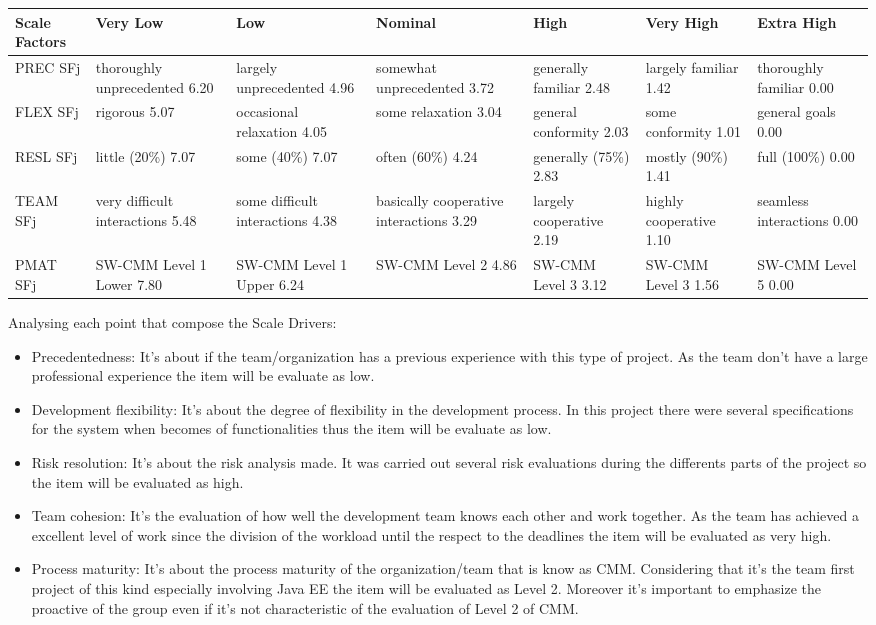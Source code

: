 \documentclass[a4paper]{article}
\begin{document}
\begin{tabular}{ | L{1.25cm} | L{2cm} | L{2cm} | L{2cm} | L{2cm} | L{2cm} | L{2cm} |}

\hline
	\textbf {Scale Factors} & \textbf {Very Low} & \textbf {Low} & \textbf {Nominal} & \textbf {High} & \textbf {Very High} & \textbf {Extra High} \\ \hline
	PREC  SFj  & thoroughly unprecedented 6.20 & largely unprecedented 4.96 & somewhat unprecedented 3.72 & generally familiar 2.48 & largely familiar 1.42& thoroughly familiar 0.00  \\ \hline
	FLEX SFj  &rigorous 5.07 &occasional relaxation 4.05 &some relaxation 3.04 &general conformity 2.03 & some conformity 1.01& general goals 0.00  \\ \hline
	RESL SFj  &little (20\%) 7.07&some (40\%) 7.07 & often (60\%) 4.24& generally (75\%) 2.83&mostly
(90\%) 1.41&full (100\%) 0.00\\ \hline
	TEAM SFj  &very difficult interactions 5.48 &some difficult interactions 4.38 &basically cooperative interactions 3.29 & largely cooperative 2.19 & highly cooperative 1.10& seamless interactions 0.00  \\ \hline
	PMAT SFj  &SW-CMM Level 1 Lower 7.80&SW-CMM Level 1 Upper 6.24&SW-CMM Level 2 4.86&SW-CMM Level 3 3.12&SW-CMM Level 3  1.56&SW-CMM Level 5  0.00\\ \hline
\end{tabular}


Analysing each point that compose the Scale Drivers:
\begin{itemize}
\item Precedentedness: It's about if the team/organization has a previous experience with this type of project. As the team don't have a large professional experience the item will be evaluate as low.
\item Development flexibility: It's about the degree of flexibility in the development process. In this project there were several specifications for the system when becomes of functionalities thus the item will be evaluate as low.
\item Risk resolution: It's about the risk analysis made. It was carried out several risk evaluations during the differents parts of the project so the item will be evaluated as high.
\item Team cohesion: It's the evaluation of how well the development team knows each other and work together. As the team has achieved a excellent level of work since the division of the workload until the respect to the deadlines the item will be evaluated as very high.
\item Process maturity: It's about the process maturity of the organization/team that is know as CMM. Considering that it's the team first project of this kind especially involving Java EE the item will be evaluated as Level 2. Moreover it's important to emphasize the proactive of the group even if it's not characteristic of the evaluation of Level 2 of CMM. 
\end{itemize}
	
\end{document}
